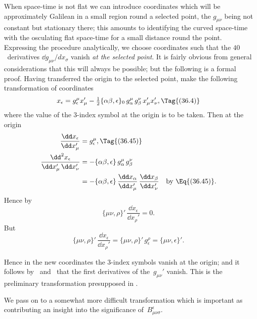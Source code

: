\documentclass[12pt]{book}
\begin{document}
When space-time is not flat we can introduce coordinates which will be
approximately Galilean in a small region round a selected point, the $g_{\mu\nu}$ being
not constant but stationary there; this amounts to identifying the curved
space-time with the osculating flat space-time for a small distance round the
point. Expressing the procedure analytically, we choose coordinates such that
the $40$~derivatives $\dd g_{\mu\nu}/dx_{\sigma}$ vanish \emph{at the selected point}. It is fairly obvious
from general considerations that this will always be possible; but the following
is a formal proof. Having transferred the origin to the selected point, make
the following transformation of coordinates
\[
x_{\epsilon} = g_{\epsilon}^{\mu} x_{\mu}' - \tfrac{1}{2} \{\alpha\beta, \epsilon\}_{0}\, g_{\alpha}^{\mu}\, g_{\beta}^{\nu}\, x_{\mu}' x_{\nu}',
\Tag{(36.4)}
\]
where the value of the $3$-index symbol at the origin is to be taken. Then at
the origin
\begin{align*}
  \frac{\dd x_{\epsilon}}{\dd x_{\mu}'} &= g_{\epsilon}^{\mu},
  \Tag{(36.45)} \\
  \frac{\dd^{2} x_{\epsilon}}{\dd x_{\mu}'\, \dd x_{\nu}'}
  &= -\{\alpha\beta, \epsilon\}\, g_{\alpha}^{\mu}\, g_{\beta}^{\nu} \\
  &= -\{\alpha\beta, \epsilon\}\, \frac{\dd x_{\alpha}}{\dd x_{\mu}'}\, \frac{\dd x_{\beta}}{\dd x_{\nu}'}
  \quad\text{by \Eq{(36.45)}.}
\end{align*}
Hence by~
\[
\{\mu\nu, \rho\}'\, \frac{\dd x_{\epsilon}}{\dd x_{\rho}'} = 0.
\]
But
\[
\{\mu\nu, \rho\}'\, \frac{\dd x_{\epsilon}}{\dd x_{\rho}'}
= \{\mu\nu, \rho\}'\, g_{\epsilon}^{\rho}
= \{\mu\nu, \epsilon\}'.
\]

Hence in the new coordinates the $3$-index symbols vanish at the origin;
and it follows by~ and~ that the first derivatives of the~$g_{\mu\nu}'$ vanish.
This is the preliminary transformation presupposed in .

We pass on to a somewhat more difficult transformation which is important
as contributing an insight into the significance of~$B_{\mu\nu\sigma}^{\epsilon}$.
\end{document}
